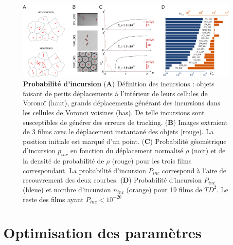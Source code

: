 	\begin{figure}[h]
    \centering
    \includegraphics[width=1\textwidth]{part_1/assets/Figure_3.png}    
    \caption{\textbf{Probabilité d'incursion} (\textbf{A}) Définition des incursions : objets faisant de petits déplacements à l'intérieur de leurs cellules de Voronoï (haut), grands déplacements générant des incursions dans les cellules de Voronoï voisines (bas). De telle incursions sont susceptibles de générer des erreurs de tracking. (\textbf{B}) Images extraient de 3 films avec le déplacement instantané des objets (rouge). La position initiale est marqué d'un point. (\textbf{C}) Probabilité géométrique d'incursion $p_{inc}$ en fonction du déplacement normalisé $\rho$ (noir) et de la densité de probabilité de $\rho$ (rouge) pour les trois films correspondant. La probabilité d'incursion $P_{inc}$ correspond à l'aire de recouvrement des deux courbes. (\textbf{D}) Probabilité d'incursion $P_{inc}$ (bleue) et nombre d'incursion $n_{inc}$ (orange) pour 19 films de $TD^2$. Le reste des films ayant $P_{inc}<10^{-20}$}
    \label{part_1:fig_3}
    \end{figure}
	
	\section{Optimisation des paramètres}
	
